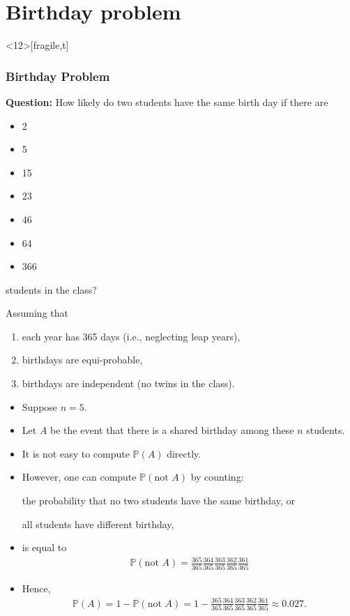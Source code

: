 \documentclass[9pt]{beamer}
\begin{document}
\section{Birthday problem}%
\begin{frame}<12>[fragile,t] %
	\frametitle{Birthday Problem}
	{\bf Question:}
  How likely do two students have the same birth day if there are
	\begin{itemize}
		\item 2
		\item 5
		\item 15
		\item 23
		\item 46
		\item 64
		\item 366
	\end{itemize}
	students in the class?
  \vfill \pause

  Assuming that \pause
  \begin{enumerate}
    \item each year has 365 days (i.e., neglecting leap years),
    \item birthdays are equi-probable,
    \item birthdays are independent (no twins in the class).
  \end{enumerate}
\end{frame}
\begin{frame}[fragile,t] %
  \begin{itemize}
    \item Suppose $n=5$.
    \item Let $A$ be the event that there is a shared birthday among these $n$ students.
    \item It is not easy to compute $\mathbb{P}(A)$ directly.
    \item However, one can compute $\mathbb{P}\left(\text{not $A$}\right)$ by counting: \bigskip
      \begin{center}
        the probability that no two students have the same birthday, or\\
        \bigskip

				all students have different birthday,
			\end{center}
			\bigskip
		\item[] is equal to
			 \begin{align*}
         \mathbb{P}\left(\text{not $A$}\right) = \frac{365}{365} \frac{364}{365} \frac{363}{365} \frac{362}{365} \frac{361}{365}
			\end{align*}
	\item Hence,
		\begin{align*}
      \mathbb{P}(A) = 1 - \mathbb{P}\left(\text{not $A$}\right) = 1- \frac{365}{365} \frac{364}{365} \frac{363}{365} \frac{362}{365} \frac{361}{365}
			\approx 0.027.
		\end{align*}
	\end{itemize}
\end{frame}
\end{document}
